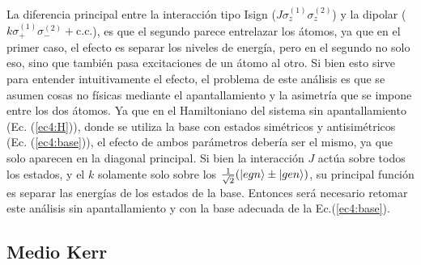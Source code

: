 La diferencia principal entre la interacción tipo Isign ($J\sigma_z^{(1)}\sigma_z^{(2)}$) y la dipolar ($k\sigma_+^{(1)}\sigma_-^{(2)}+\text{c.c.}$), es que el segundo parece entrelazar los átomos, ya que en el primer caso, el efecto es separar los niveles de energía, pero en el segundo no solo eso, sino que también pasa excitaciones de un átomo al otro. Si bien esto sirve para entender intuitivamente el efecto, el problema de este análisis es que se asumen cosas no físicas mediante el apantallamiento y la asimetría que se impone entre los dos átomos. Ya que en el Hamiltoniano del sistema sin apantallamiento (Ec. (\ref{ec4:H})), donde se utiliza la base con estados simétricos y antisimétricos (Ec. (\ref{ec4:base})), el efecto de ambos parámetros debería ser el mismo, ya que solo aparecen en la diagonal principal. Si bien la interacción $J$ actúa sobre todos los estados, y el $k$ solamente solo sobre los $\frac{1}{\sqrt{2}}(\ket{egn}\pm \ket{gen})$, su principal función es separar las energías de los estados de la base.
Entonces será necesario retomar este análisis sin apantallamiento y con la base adecuada de la Ec.(\ref{ec4:base}).

\subsection{Medio Kerr}
\label{sec4:medio kerr}

